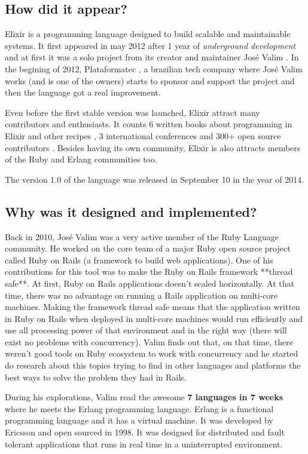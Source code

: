 
\subsection{How did it appear?}

Elixir \cite{5_1} is a programming language
designed to build scalable and maintainable systems. It first appeared in may
2012 after 1 year of \textit{underground development} and at first it was a solo
project from its creator and maintainer José
Valim \cite{5_2}. In the begining of 2012,
Plataformatec \cite{5_3}, a brazilian tech company
where José Valim works (and is one of the owners) starts to sponsor and support
the project and then the language got a real improvement.

Even before the first stable version was launched, Elixir attract many
contributors and enthusiasts. It counts 6 written books about programming in
Elixir and other recipes \cite{5_4}, 3
international conferences \cite{5_5} and 300+
open source contributors \cite{5_6}. Besides having
its own community, Elixir is also attracts members of the Ruby and Erlang
communities too.

The version 1.0 of the language \cite{5_7} was
released in September 10 in the year of 2014.

\subsection{Why was it designed and implemented?}

Back in 2010, José Valim was a very active member of the Ruby
Language \cite{5_8} community. He worked on the
core team of a major Ruby open source project called Ruby on
Rails \cite{5_9} (a framework to build web
applications). One of his contributions for this tool was to make the Ruby on
Rails framework **thread safe**. At first, Ruby on Rails applications doesn't
scaled horizontally. At that time, there was no advantage on running a Rails
application on multi-core machines. Making the framework thread safe means that
the application written in Ruby on Rails when deployed in multi-core machines
would run efficiently and use all processing power of that environment and in
the right way (there will exist no problems with concurrency). Valim finds out
that, on that time, there weren't good tools on Ruby ecosystem to work with
concurrency and he started do research about this topics trying to find in other
languages and platforms the best ways to solve the problem they had in Rails.

During his explorations, Valim read the awesome \textbf{7 languages in 7 weeks} 
\cite{5_10} where he meets the Erlang \cite{5_11} programming language. Erlang
is a functional programming language and it has a virtual machine. It was
developed by Ericsson \cite{5_12} and open sourced in 1998. It was designed for
distributed and fault tolerant applications that runs in real time in a
uninterrupted environment.

